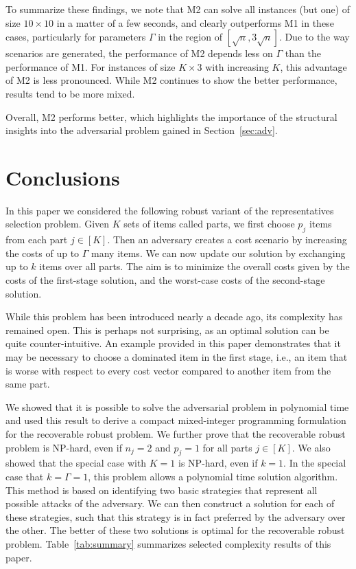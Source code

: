 \documentclass[a4paper,11pt,abstracton]{scrartcl}
\theoremstyle{definition}
\theoremstyle{remark}
\begin{document}
To summarize these findings, we note that M2 can solve all instances (but one) of size $10\times 10$ in a matter of a few seconds, and clearly outperforms M1 in these cases, particularly for parameters $\Gamma$ in the region of $[\sqrt{n},3\sqrt{n}]$. Due to the way scenarios are generated, the performance of M2 depends less on $\Gamma$ than the performance of M1. For instances of size $K \times 3$ with increasing $K$, this advantage of M2 is less pronounced. While M2 continues to show the better performance, results tend to be more mixed.

Overall, M2 performs better, which highlights the importance of the structural insights into the adversarial problem gained in Section~\ref{sec:adv}.

\section{Conclusions}
\label{sec:conclusions}

In this paper we considered the following robust variant of the representatives selection problem. Given $K$ sets of items called parts, we first choose $p_j$ items from each part $j\in[K]$. Then an adversary creates a cost scenario by increasing the costs of up to $\Gamma$ many items. We can now update our solution by exchanging up to $k$ items over all parts. The aim is to minimize the overall costs given by the costs of the first-stage solution, and the worst-case costs of the second-stage solution.

While this problem has been introduced nearly a decade ago, its complexity has remained open. This is perhaps not surprising, as an optimal solution can be quite counter-intuitive. An example provided in this paper demonstrates that it may be necessary to choose a dominated item in the first stage, i.e., an item that is worse with respect to every cost vector compared to another item from the same part.

We showed that it is possible to solve the adversarial problem in polynomial time and used this result to derive a compact mixed-integer programming formulation for the recoverable robust problem. We further prove that the recoverable robust problem is NP-hard, even if $n_j=2$ and $p_j=1$ for all parts $j\in[K]$. We also showed that the special case with $K=1$ is NP-hard, even if $k=1$. In the special case that $k=\Gamma=1$, this problem allows a polynomial time solution algorithm. This method is based on identifying two basic strategies that represent all possible attacks of the adversary. We can then construct a solution for each of these strategies, such that this strategy is in fact preferred by the adversary over the other. The better of these two solutions is optimal for the recoverable robust problem. Table~\ref{tab:summary} summarizes selected complexity results of this paper.
\end{document}
